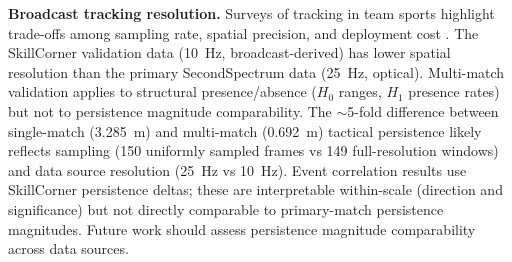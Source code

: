 \textbf{Broadcast tracking resolution.} Surveys of tracking in team sports highlight trade-offs among sampling rate, spatial precision, and deployment cost \citep{Cummins2013, Aughey2011}. The SkillCorner validation data (10~Hz, broadcast-derived) has lower spatial resolution than the primary SecondSpectrum data (25~Hz, optical). Multi-match validation applies to structural presence/absence (\(H_0\) ranges, \(H_1\) presence rates) but not to persistence magnitude comparability. The \(\sim\)5-fold difference between single-match (3.285~m) and multi-match (0.692~m) tactical persistence likely reflects sampling (150 uniformly sampled frames vs 149 full-resolution windows) and data source resolution (25~Hz vs 10~Hz). Event correlation results use SkillCorner persistence deltas; these are interpretable within-scale (direction and significance) but not directly comparable to primary-match persistence magnitudes. Future work should assess persistence magnitude comparability across data sources.

